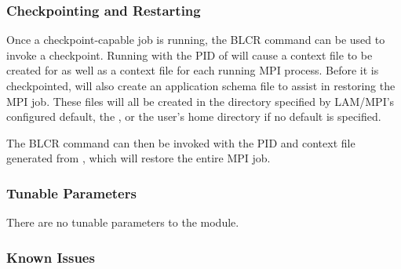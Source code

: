\subsubsection{Checkpointing and Restarting}

Once a checkpoint-capable job is running, the BLCR command
 can be used to invoke a checkpoint.  Running
 with the PID of  will cause a
context file to be created for  as well as a context file
for each running MPI process.  Before it is checkpointed, 
will also create an application schema file to assist in restoring the
MPI job.  These files will all be created in the directory specified
by LAM/MPI's configured default, the
, or the user's home directory if
no default is specified.

The BLCR  command can then be invoked with the PID
and context file generated from , which will restore the
entire MPI job.


\subsubsection{Tunable Parameters}

There are no tunable parameters to the   module.

 
\subsubsection{Known Issues}

